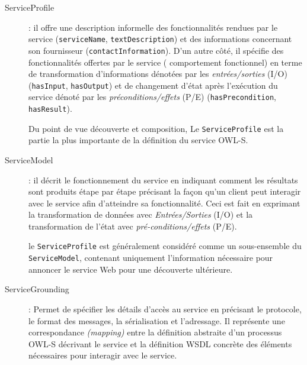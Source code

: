     \renewcommand{\descriptionlabel}[1]{\hspace{0.5cm}\textbullet~\texttt{#1}}
    \begin{description}
    \item[ServiceProfile]: il offre une description informelle des
      fonctionnalités rendues par le service (\verb|serviceName|,
      \verb|textDescription|) et des informations concernant son
      fournisseur (\verb|contactInformation|). D'un autre côté, il
      spécifie des fonctionnalités offertes par le service (
      comportement fonctionnel) en terme de transformation
      d'informations dénotées par les \textit{entrées/sorties}
      \textsc{(I/O)} (\verb|hasInput|, \verb|hasOutput|) et de
      changement d'état après l'exécution du service dénoté par les
      \textit{préconditions/effets} \textsc{(P/E)}
      (\verb|hasPrecondition|, \verb|hasResult|).\medskip

      Du point de vue découverte et composition, Le
      \verb|ServiceProfile| est la partie la plus importante de la
      définition du service \textsc{OWL-S}.

    \item[ServiceModel]: il décrit le fonctionnement du service en
      indiquant comment les résultats sont produits étape par étape
      précisant la façon qu'un client peut interagir avec le service afin
      d'atteindre sa fonctionnalité. Ceci est fait en exprimant la
      transformation de données avec \textit{Entrées/Sorties}
      \textsc{(I/O)} et la transformation de l'état avec
      \textit{pré-conditions/effets} \textsc{(P/E)}.\medskip

      le \verb|ServiceProfile| est généralement considéré comme un
      sous-ensemble du \verb|ServiceModel|, contenant uniquement
      l'information nécessaire pour annoncer le service Web pour une
      découverte ultérieure.

    \item[ServiceGrounding]: Permet de spécifier les détails d'accès
      au service en précisant le protocole, le format des messages, la
      sérialisation et l'adressage. Il représente une correspondance
      \textit{(mapping)} entre la définition abstraite d'un processus
      \textsc{OWL-S} décrivant le service et la définition
      \textsc{WSDL} concrète des éléments nécessaires pour interagir
      avec le service.

    \end{description}
    \enddescription

